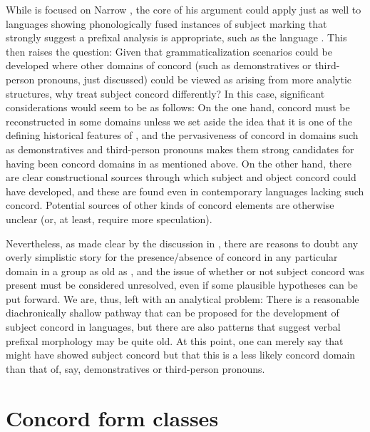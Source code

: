 \documentclass[output=paper ,collection	  ,collectionchapter ,biblatexbackend=biber   ]{langscibook}
\begin{document}
While  is focused on Narrow , the core of
his argument could apply just as well to  languages showing
phonologically fused instances of subject marking that strongly suggest a
prefixal analysis is appropriate, such as the  language 
\cite{Bond2010}. This then raises the question: Given that grammaticalization
scenarios could be developed where other domains of concord (such as
demonstratives or third-person pronouns, just discussed) could be viewed as
arising from more analytic structures, why treat subject concord differently? In
this case, significant considerations would seem to be as follows: On the one
hand, concord must be reconstructed in some domains unless we set aside the idea
that it is one of the defining historical features of , and
the pervasiveness of concord in domains such as demonstratives and third-person
pronouns makes them strong candidates for having been concord domains in  as mentioned above. On the other hand, there are clear
constructional sources through which subject and object concord could have
developed, and these are found even in contemporary languages lacking such
concord. Potential sources of other kinds of concord elements are otherwise
unclear (or, at least, require more speculation).

\newpage 
Nevertheless, as made clear by the discussion in ,
there are reasons to doubt any overly simplistic story for the presence/absence
of concord in any particular domain in a group as old as ,
and the issue of whether or not subject concord was present must be considered
unresolved, even if some plausible hypotheses can be put forward. We are, thus,
left with an analytical problem: There is a reasonable diachronically shallow
pathway that can be proposed for the development of subject concord in  languages, but there are also patterns that suggest verbal prefixal
morphology may be quite old. At this point, one can merely say that  might have showed subject concord but that this is a less likely
concord domain than that of, say, demonstratives or third-person pronouns.



\section{Concord form classes \label{FormClasses}}\label{sec:good:5}
\end{document}
